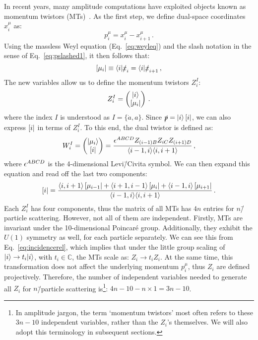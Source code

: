 \documentclass[main.tex]{subfiles}
\begin{document}
In recent years, many amplitude computations have exploited objects known as momentum twistors (MTs)~\cite{Hodges:2009hk, Badger:2013gxa, Badger:2016uuq}. As the first step, we define dual-space coordinates $x_i^\mu$ as:
\begin{equation} \label{eq:dualspacedef}
    p_i^\mu = x_i^\mu - x_{i+1}^\mu\,.
\end{equation}
Using the massless Weyl equation (Eq.~\ref{eq:weyleq}) and the slash notation in the sense of Eq.~\ref{eq:pslashed1}, it then follows that:
\begin{equation} \label{eq:incidencerel}
    \left[ \mu_i \right| \equiv \langle i|\slashed{x}_i = \langle i|\slashed{x}_{i+1}\,,
\end{equation}
The new variables allow us to define the momentum twistors $Z_i^I$:
\begin{equation} \label{eq:momtwistor}
    Z_i^I = 
    \begin{pmatrix}
        |i \rangle \\
        \left[ \mu_i \right| 
    \end{pmatrix}\,.
\end{equation}
where the index $I$ is understood as $I=\{\dot{a},a\}$. Since $\slashed{p} = |i \rangle\left[ i \right|$, we can also express $\left[ i \right|$ in terms of $Z_i^I$. To this end, the dual twistor is defined as:
\begin{equation} \label{eq:dualmomtwistor}
    W_i^I = 
    \begin{pmatrix}
        |\mu_i \rangle \\
        \left[ i \right|
    \end{pmatrix} = 
    \frac{\epsilon^{ABCD} Z_{(i-1)B} Z_{iC} Z_{(i+1)D}}{\langle i-1, i \rangle \langle i, i+1 \rangle}\,,
\end{equation}
where $\epsilon^{ABCD}$ is the 4-dimensional Levi\=/Civita symbol. We can then expand this equation and read off the last two components:
\begin{equation}
    \left[ i \right| = \frac{\langle i, i+1 \rangle\left[ \mu_{i-1} \right| + \langle i+1, i-1 \rangle\left[ \mu_i \right| + \langle i-1, i \rangle\left[ \mu_{i+1} \right| }{\langle i-1, i \rangle\langle i, i+1 \rangle}\,.
\end{equation}
Each $Z_i^I$ has four components, thus the matrix of all MTs has $4n$ entries for $n$\=/particle scattering. However, not all of them are independent. Firstly, MTs are invariant under the 10-dimensional Poincaré group. Additionally, they exhibit the $U(1)$ symmetry as well, for each particle separately. We can see this from Eq.~\ref{eq:incidencerel}, which implies that under the little group scaling of $|i \rangle\rightarrow t_i|i \rangle$, with $t_i \in \mathbb{C}$, the MTs scale as: $Z_i \rightarrow t_i Z_i$. At the same time, this transformation does not affect the underlying momentum $p_i^\mu$, thus $Z_i$ are defined projectively. Therefore, the number of independent variables needed to generate all $Z_i$ for $n$\=/particle scattering is\footnote{In amplitude jargon, the term `momentum twistors' most often refers to these $3n-10$ independent variables, rather than the $Z_i$'s themselves. We will also adopt this terminology in subsequent sections.}: $4n-10-n\times1 = 3n-10$.
\end{document}
